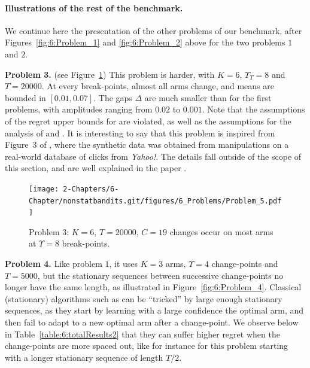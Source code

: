 \paragraph{Illustrations of the rest of the benchmark.}\label{par:6:benchmark2}

We continue here the presentation of the other problems of our benchmark, after Figures~\ref{fig:6:Problem_1} and \ref{fig:6:Problem_2} above for the two problems $1$ and $2$.

\textbf{Problem 3.} (see Figure~\ref{fig:6:Problem_5}) This problem is harder, with $K=6$, $\Upsilon_T=8$ and $T=20000$.
At every break-points, almost all arms change,
and means are bounded in $[0.01, 0.07]$.
The gaps $\Delta$ are much smaller than for the first problems, with amplitudes ranging from $0.02$ to $0.001$.
Note that the assumptions of the regret upper bounds for \GLRklUCB{} are violated, as well as the assumptions for the analysis of \MUCB{} and \CUSUMUCB.
It is interesting to say that this problem is inspired from Figure~3 of \cite{CaoZhenKvetonXie18}, where the synthetic data was obtained from manipulations on a real-world database of clicks from \emph{Yahoo!}.
%
The details fall outside of the scope of this section, and are well explained in the paper \cite{CaoZhenKvetonXie18}.

\begin{figure}[h!]  %
    \centering
    \texttt{[image: 2-Chapters/6-Chapter/nonstatbandits.git/figures/6\_Problems/Problem\_5.pdf]}
    \caption{Problem $3$: $K=6$, $T=20000$, $C=19$ changes occur on most arms at $\Upsilon=8$ break-points.}
    \label{fig:6:Problem_5}
\end{figure}


\textbf{Problem 4.}
%
Like problem $1$, it uses $K=3$ arms, $\Upsilon=4$ change-points and $T=5000$,
but the stationary sequences between successive change-points no longer have the same length, as illustrated in Figure~\ref{fig:6:Problem_4}.
Classical (stationary) algorithms such as \klUCB{} can be ``tricked'' by large enough stationary sequences, as they start by learning with a large confidence the optimal arm, and then fail to adapt to a new optimal arm after a change-point.
We observe below in Table~\ref{table:6:totalResults2} that they can suffer higher regret when the change-points are more spaced out, like for instance for this problem starting with a longer stationary sequence of length $T/2$.

